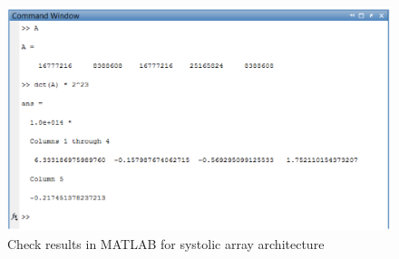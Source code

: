         \begin{figure}[h!]
        	\centering
        	\includegraphics[width=\textwidth]{imm/dct/dct_sa4.png}  
        	\caption{Check results in MATLAB for systolic array architecture} 
        	\label{fig:dct_sa4}
        \end{figure}
   \clearpage
   
   
